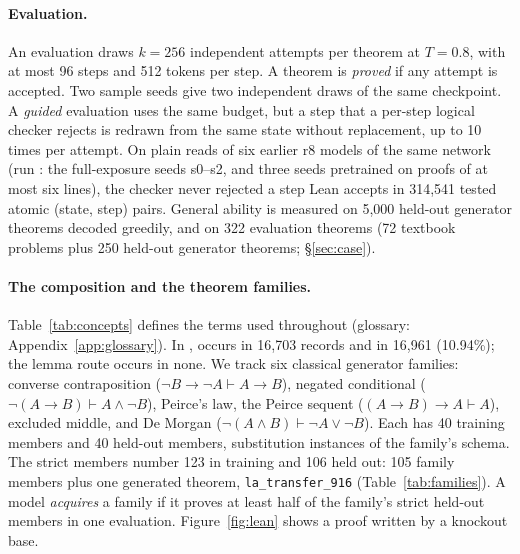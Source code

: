 \paragraph{Evaluation.} An evaluation draws $k=256$ independent attempts per theorem at $T=0.8$, with at most 96 steps
and 512 tokens per step. A theorem is \emph{proved} if any attempt is accepted. Two sample seeds give two independent
draws of the same checkpoint. A \emph{guided} evaluation uses the same budget, but a step that a per-step logical
checker rejects is redrawn from the same state without replacement, up to 10 times per attempt. On plain reads of
six earlier r8 models of the same network (run : the full-exposure seeds s0--s2, and three seeds
pretrained on proofs of at most six lines), the checker never
rejected a step Lean accepts in 314,541 tested atomic (state, step) pairs. General ability is measured on 5,000 held-out
generator theorems decoded greedily, and on 322 evaluation theorems (72 textbook problems plus 250 held-out generator
theorems; \S\ref{sec:case}).

\paragraph{The composition and the theorem families.} Table~\ref{tab:concepts} defines the terms used throughout
(glossary: Appendix~\ref{app:glossary}).
In \KT{}, \sig{} occurs in 16,703 records and \sigp{} in 16,961 (10.94\%); the lemma route occurs in none. We track six
classical generator families: converse contraposition ($\neg B \to \neg A \vdash A \to B$), negated conditional
($\neg(A\to B) \vdash A \land \neg B$), Peirce's law, the Peirce sequent ($(A\to B)\to A \vdash A$), excluded middle, and
De Morgan ($\neg(A\land B) \vdash \neg A \lor \neg B$). Each has 40 training members and 40 held-out members,
substitution instances of the family's schema. The strict members number 123 in training and 106 held out: 105 family
members plus one generated theorem, \texttt{la\_transfer\_916} (Table~\ref{tab:families}). A model \emph{acquires} a
family if it proves at least half of the family's strict held-out members in one evaluation. Figure~\ref{fig:lean}
shows a \sig{} proof written by a knockout base.

